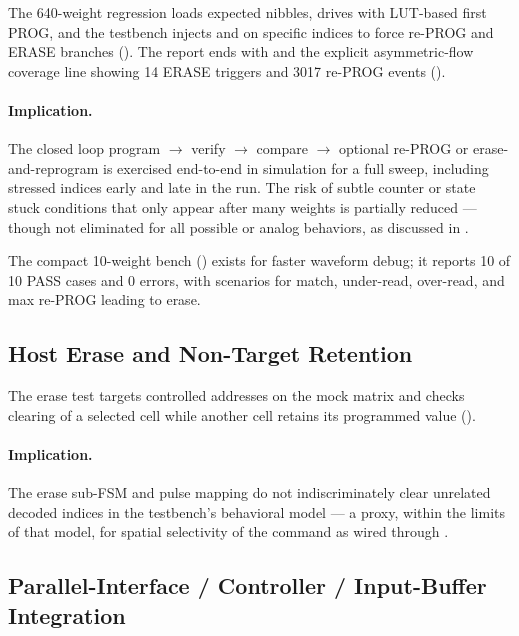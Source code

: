 The 640-weight regression loads expected nibbles, drives 
with LUT-based first PROG, and the testbench injects
 and  on specific
indices to force re-PROG and ERASE branches
(). The report
ends with  and the explicit
asymmetric-flow coverage line showing 14 ERASE triggers and 3017
re-PROG events ().

\paragraph{Implication.}
The closed loop program \(\rightarrow\) verify \(\rightarrow\) compare
\(\rightarrow\) optional re-PROG or erase-and-reprogram is exercised
end-to-end in simulation for a full sweep, including stressed indices
early and late in the run. The risk of subtle counter or state stuck
conditions that only appear after many weights is partially reduced ---
though not eliminated for all possible  or analog
behaviors, as discussed in .

The compact 10-weight bench () exists for faster
waveform debug; it reports 10 of 10 PASS cases and 0 errors, with
scenarios for match, under-read, over-read, and max re-PROG leading to
erase.

\subsection{Host Erase and Non-Target Retention}
\label{sec:analysis-host-erase}

The erase test targets controlled addresses on the mock matrix and
checks clearing of a selected cell while another cell retains its
programmed value ().

\paragraph{Implication.}
The erase sub-FSM and pulse mapping do not indiscriminately clear
unrelated decoded indices in the testbench's behavioral model --- a
proxy, within the limits of that model, for spatial selectivity of the
command as wired through .

\subsection{Parallel-Interface / Controller / Input-Buffer Integration}
\label{sec:analysis-integration}

